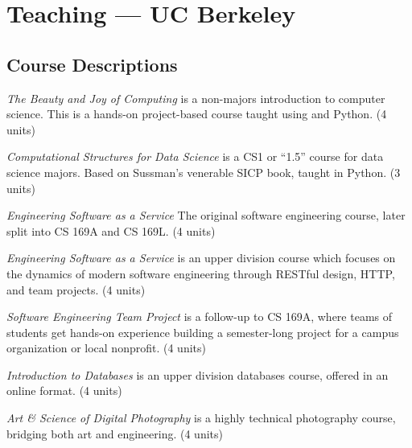 \section{Teaching — UC Berkeley}

\vspace{6pt}

\subsection{Course Descriptions}

\vspace{5pt}
\begin{description}
    \setlength\itemsep{0.7em}
    \item[CS 10] \textit{The Beauty and Joy of Computing} is a non-majors introduction to computer science. This is a hands-on project-based course taught using \snap and Python.  (4 units) %
    
    \item[CS 88 / DATA C88C] \textit{Computational Structures for Data Science} is a CS1 or ``1.5'' course for data science majors. Based on Sussman's venerable SICP book, taught in Python. (3 units)

    \item[CS 169] \textit{Engineering Software as a Service} The original software engineering course, later split into CS 169A and CS 169L. (4 units)
    
    \item[CS 169A] \textit{Engineering Software as a Service} is an upper division course which focuses on the dynamics of modern software engineering through RESTful design, HTTP, and team projects. (4 units)
    
    \item[CS 169L] \textit{Software Engineering Team Project} is a follow-up to CS 169A, where teams of students get hands-on experience building a semester-long project for a campus organization or local nonprofit.  (4 units)
    
    \item[CS W186] \textit{Introduction to Databases} is an upper division databases course, offered in an online format.  (4 units)
    
    \item[CS 194-23] \textit{Art \& Science of Digital Photography} is a highly technical photography course, bridging both art and engineering. (4 units)
    

\end{description}
